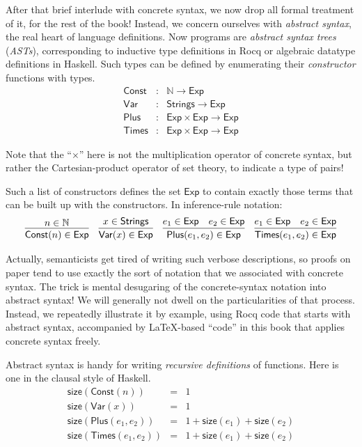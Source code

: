 \documentclass{amsbook}
\theoremstyle{definition}
\theoremstyle{remark}
\numberwithin{section}{chapter}
\numberwithin{equation}{chapter}
\begin{document}
After that brief interlude with concrete syntax, we now drop all formal treatment of it, for the rest of the book!
Instead, we concern ourselves with \emph{abstract syntax}, the real heart of language definitions.
Now programs are \emph{abstract syntax trees} (\emph{ASTs}), corresponding to inductive type definitions in Rocq or algebraic datatype definitions in Haskell.
Such types can be defined by enumerating their \emph{constructor} functions with types.
\encoding
\begin{eqnarray*}
  \mathsf{Const} &:& \mathbb{N} \to \mathsf{Exp} \\
  \mathsf{Var} &:& \mathsf{Strings} \to \mathsf{Exp} \\
  \mathsf{Plus} &:& \mathsf{Exp} \times \mathsf{Exp} \to \mathsf{Exp} \\
  \mathsf{Times} &:& \mathsf{Exp} \times \mathsf{Exp} \to \mathsf{Exp}
\end{eqnarray*}

Note that the ``$\times$'' here is not the multiplication operator of concrete syntax, but rather the Cartesian-product operator of set theory, to indicate a type of pairs!

Such a list of constructors defines the set $\mathsf{Exp}$ to contain exactly those terms that can be built up with the constructors.
In inference-rule notation:
\encoding
$$\infer{\mathsf{Const}(n) \in \mathsf{Exp}}{
  n \in \mathbb N
}
\quad \infer{\mathsf{Var}(x) \in \mathsf{Exp}}{
  x \in \mathsf{Strings}
}
\quad \infer{\mathsf{Plus}(e_1, e_2) \in \mathsf{Exp}}{
  e_1 \in \mathsf{Exp}
  & e_2 \in \mathsf{Exp}
}
\quad \infer{\mathsf{Times}(e_1, e_2) \in \mathsf{Exp}}{
  e_1 \in \mathsf{Exp}
  & e_2 \in \mathsf{Exp}
}$$

Actually, semanticists get tired of writing such verbose descriptions, so proofs on paper tend to use exactly the sort of notation that we associated with concrete syntax.
The trick is mental desugaring of the concrete-syntax notation into abstract syntax!
We will generally not dwell on the particularities of that process.
Instead, we repeatedly illustrate it by example, using Rocq code that starts with abstract syntax, accompanied by \LaTeX{}-based ``code'' in this book that applies concrete syntax freely.

Abstract syntax is handy for writing \emph{recursive definitions} of functions.
Here is one in the clausal style of Haskell.
\begin{eqnarray*}
  \mathsf{size}(\mathsf{Const}(n)) &=& 1 \\
  \mathsf{size}(\mathsf{Var}(x)) &=& 1 \\
  \mathsf{size}(\mathsf{Plus}(e_1, e_2)) &=& 1 + \mathsf{size}(e_1) + \mathsf{size}(e_2) \\
  \mathsf{size}(\mathsf{Times}(e_1, e_2)) &=& 1 + \mathsf{size}(e_1) + \mathsf{size}(e_2)
\end{eqnarray*}
\end{document}
